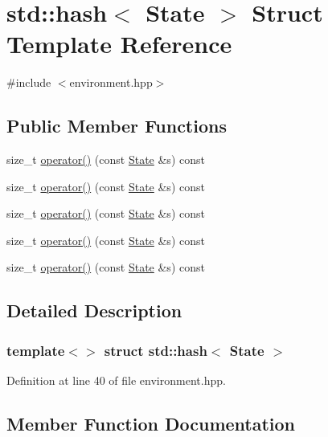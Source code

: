 \hypertarget{structstd_1_1hash_3_01_state_01_4}{}\section{std\+:\+:hash$<$ State $>$ Struct Template Reference}
\label{structstd_1_1hash_3_01_state_01_4}


{\ttfamily \#include $<$environment.\+hpp$>$}

\subsection*{Public Member Functions}
\begin{DoxyCompactItemize}
\item 
size\+\_\+t \hyperlink{structstd_1_1hash_3_01_state_01_4_af7fa7225302eecf4b97ebb57bcaf3b70}{operator()} (const \hyperlink{structlib_multi_robot_planning_1_1_state}{State} \&s) const
\item 
size\+\_\+t \hyperlink{structstd_1_1hash_3_01_state_01_4_af7fa7225302eecf4b97ebb57bcaf3b70}{operator()} (const \hyperlink{struct_state}{State} \&s) const
\item 
size\+\_\+t \hyperlink{structstd_1_1hash_3_01_state_01_4_af7fa7225302eecf4b97ebb57bcaf3b70}{operator()} (const \hyperlink{struct_state}{State} \&s) const
\item 
size\+\_\+t \hyperlink{structstd_1_1hash_3_01_state_01_4_af7fa7225302eecf4b97ebb57bcaf3b70}{operator()} (const \hyperlink{struct_state}{State} \&s) const
\item 
size\+\_\+t \hyperlink{structstd_1_1hash_3_01_state_01_4_af7fa7225302eecf4b97ebb57bcaf3b70}{operator()} (const \hyperlink{struct_state}{State} \&s) const
\end{DoxyCompactItemize}


\subsection{Detailed Description}
\subsubsection*{template$<$$>$\newline
struct std\+::hash$<$ State $>$}



Definition at line 40 of file environment.\+hpp.



\subsection{Member Function Documentation}
\mbox{\label{structstd_1_1hash_3_01_state_01_4_af7fa7225302eecf4b97ebb57bcaf3b70}} 
